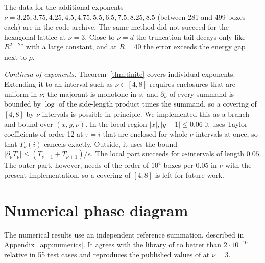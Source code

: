 \documentclass[10pt,twocolumn,a4paper]{article}
\theoremstyle{definition}
\begin{document}
The data for the additional exponents $\nu=3.25,3.75,4.25,4.5,4.75,5.5,6.5,7.5,8.25,8.5$ (between 281 and 499 boxes each) are in the code archive. The same method did not succeed for the hexagonal lattice at $\nu=3$. Close to $\nu=d$ the truncation tail decays only like $R^{2-2\nu}$ with a large constant, and at $R=40$ the error exceeds the energy gap next to $\rho$.

\smallskip\noindent\emph{Continua of exponents.} Theorem~\ref{thm:finite} covers individual exponents. Extending it to an interval such as $\nu\in[4,8]$ requires enclosures that are uniform in $\nu$; the majorant is monotone in $s$, and $\partial_\nu$ of every summand is bounded by $\log$ of the side-length product times the summand, so a covering of $[4,8]$ by $\nu$-intervals is possible in principle. We implemented this as a branch and bound over $(x,y,\nu)$. In the local region $|x|,|y-1|\le0.06$ it uses Taylor coefficients of order 12 at $\tau=i$ that are enclosed for whole $\nu$-intervals at once, so that $T_\nu(i)$ cancels exactly. Outside, it uses the bound $|\partial_\nu T_\nu|\le(T_{\nu-1}+T_{\nu+1})/e$. The local part succeeds for $\nu$-intervals of length $0.05$. The outer part, however, needs of the order of $10^4$ boxes per $0.05$ in $\nu$ with the present implementation, so a covering of $[4,8]$ is left for future work.

\section{Numerical phase diagram}\label{sec:numerics}
The numerical results use an independent reference summation, described in Appendix~\ref{app:numerics}. It agrees with the library of \cite{BuchheitRupp} to better than $2\cdot10^{-10}$ relative in 55 test cases and reproduces the published values of \cite{RoblesNavarro} at $\nu=3$.
\end{document}
